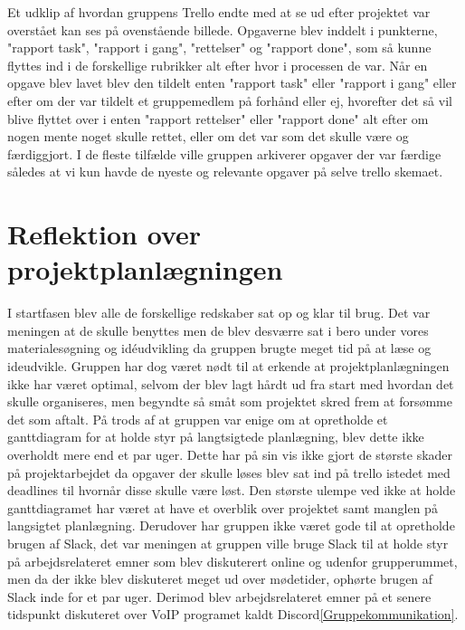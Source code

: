 Et udklip af hvordan gruppens Trello endte med at se ud efter projektet var overstået kan ses på ovenstående billede. Opgaverne blev inddelt i punkterne, "rapport task", "rapport i gang", "rettelser" og "rapport done", som så kunne flyttes ind i de forskellige rubrikker alt efter hvor i processen de var. Når en opgave blev lavet blev den tildelt enten "rapport task" eller "rapport i gang" eller efter om der var tildelt et gruppemedlem på forhånd eller ej, hvorefter det så vil blive flyttet over i enten "rapport rettelser" eller "rapport done" alt efter om nogen mente noget skulle rettet, eller om det var som det skulle være og færdiggjort. I de fleste tilfælde ville gruppen arkiverer opgaver der var færdige således at vi kun havde de nyeste og relevante opgaver på selve trello skemaet.

\section{Reflektion over projektplanlægningen}\label{Reflektion-over-projektplanlaegningen}
I startfasen blev alle de forskellige redskaber sat op og klar til brug. Det var meningen at de skulle benyttes men de blev desværre sat i bero under vores materialesøgning og idéudvikling da gruppen brugte meget tid på at læse og ideudvikle. Gruppen har dog været nødt til at erkende at projektplanlægningen ikke har været optimal, selvom der blev lagt hårdt ud fra start med hvordan det skulle organiseres, men begyndte så småt som projektet skred frem at forsømme det som aftalt. På trods af at gruppen var enige om at opretholde et ganttdiagram for at holde styr på langtsigtede planlægning, blev dette ikke overholdt mere end et par uger. Dette har på sin vis ikke gjort de største skader på projektarbejdet da opgaver der skulle løses blev sat ind på trello istedet med deadlines til hvornår disse skulle være løst. Den største ulempe ved ikke at holde ganttdiagramet har været at have et overblik over projektet samt manglen på langsigtet planlægning. Derudover har gruppen ikke været gode til at opretholde brugen af Slack, det var meningen at gruppen ville bruge Slack til at holde styr på arbejdsrelateret emner som blev diskuterert online og udenfor grupperummet, men da der ikke blev diskuteret meget ud over mødetider, ophørte brugen af Slack inde for et par uger. Derimod blev arbejdsrelateret emner på et senere tidspunkt diskuteret over VoIP programet kaldt Discord\ref{Gruppekommunikation}.
